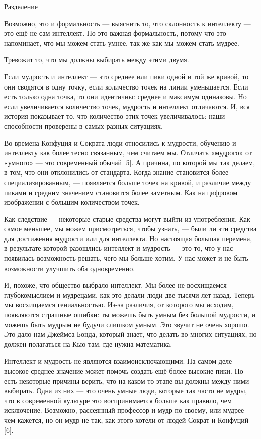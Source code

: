 \documentclass[ebook,12pt,oneside,openany]{memoir}
\begin{document}
Разделение

Возможно, это и формальность — выяснить то, что склонность к
интеллекту — это ещё не сам интеллект. Но это важная формальность,
потому что это напоминает, что мы можем стать умнее, так же как мы
можем стать мудрее.

Тревожит то, что мы должны выбирать между этими двумя.

Если мудрость и интеллект — это среднее или пики одной и той же
кривой, то они сводятся в одну точку, если количество точек на линии
уменьшается. Если есть только одна точка, то они идентичны: среднее и
максимум одинаковы. Но если увеличивается количество точек, мудрость и
интеллект отличаются. И, вся история показывает то, что количество
этих точек увеличивалось: наши способности проверены в самых разных
ситуациях.

Во времена Конфуция и Сократа люди относились к мудрости, обучению и
интеллекту как более тесно связанным, чем считаем мы. Отличать
«мудрого» от «умного» — это современный обычай [5]. А причина, по
которой мы так делаем, в том, что они отклонились от стандарта. Когда
знание становится более специализированным, — появляется больше точек
на кривой, и различие между пиками и средним значением становится
более заметным. Как на цифровом изображении с большим количеством
точек.

Как следствие — некоторые старые средства могут выйти из употребления.
Как самое меньшее, мы можем присмотреться, чтобы узнать, — были ли эти
средства для достижения мудрости или для интеллекта. Но настоящая
большая перемена, в результате которой разошлись интеллект и мудрость
— это то, что у нас появилась возможность решать, чего мы больше
хотим. У нас может и не быть возможности улучшить оба одновременно.

И, похоже, что общество выбрало интеллект. Мы более не восхищаемся
глубокомыслием и мудрецами, как это делали люди две тысячи лет назад.
Теперь мы восхищаемся гениальностью. Из-за различия, от которого мы
исходим, появляются страшные ошибки: ты можешь быть умным без большой
мудрости, и можешь быть мудрым не будучи слишком умным. Это звучит не
очень хорошо. Это дало нам Джеймса Бонда, который знает, что делать во
многих ситуациях, но должен полагаться на Кью там, где нужна
математика.

Интеллект и мудрость не являются взаимоисключающими. На самом деле
высокое среднее значение может помочь создать ещё более высокие пики.
Но есть некоторые причины верить, что на каком-то этапе вы должны
между ними выбирать. Одна из них — это очень умные люди, которые так
часто не мудры, что в современной культуре это воспринимается больше
как правило, чем исключение. Возможно, рассеянный профессор и мудр
по-своему, или мудрее чем кажется, но он мудр не так, как этого хотели
от людей Сократ и Конфуций [6].
\end{document}
